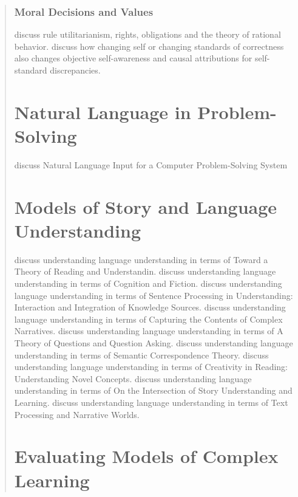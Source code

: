 \begin{quotation}
\subsubsection{Moral Decisions and Values}

\cite{harsanyi1980rur} discuss rule utilitarianism, rights, obligations and the theory of rational behavior.
\cite{duval1999osa} discuss how changing self or changing standards of correctness also changes objective self-awareness and causal attributions for self-standard discrepancies.


\section{Natural Language in Problem-Solving}

\cite{bobrow1968nlicpss} discuss Natural Language Input for a Computer Problem-Solving System



\section{Models of Story and Language Understanding}


\cite{rammoorman1999toru} discuss understanding language understanding in terms of Toward a Theory of Reading and Understandin.
\cite{rapaport1999caf} discuss understanding language understanding in terms of Cognition and Fiction.
\cite{mahesh1999spiu} discuss understanding language understanding in terms of Sentence Processing in Understanding: Interaction and Integration of Knowledge Sources.
\cite{domeshek1999ctccn} discuss understanding language understanding in terms of Capturing the Contents of Complex Narratives.
\cite{ram1999toqqa} discuss understanding language understanding in terms of A Theory of Questions and Question Asking.
\cite{peterson1999sct} discuss understanding language understanding in terms of Semantic Correspondence Theory.
\cite{moorman1999crunc} discuss understanding language understanding in terms of Creativity in Reading: Understanding Novel Concepts.
\cite{coxram1999sual} discuss understanding language understanding in terms of On the Intersection of Story Understanding and Learning.
\cite{gerrig1999tpanw} discuss understanding language understanding in terms of Text Processing and Narrative Worlds.

\section{Evaluating Models of Complex Learning}



\end{quotation}
